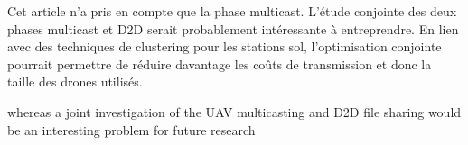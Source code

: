 \documentclass[utf8, a4paper]{beamer}
\begin{document}
\begin{frame} {}

Cet article n'a pris en compte que la phase multicast. L'étude conjointe
des deux phases multicast et D2D serait probablement intéressante à entreprendre.
En lien avec des techniques de clustering pour les stations sol, l'optimisation
conjointe pourrait permettre de réduire davantage les coûts de transmission et donc la taille des drones
utilisés.

\end{frame}

whereas a joint
investigation of the UAV multicasting and D2D file sharing
would be an interesting problem for future research





%
%
\end{document}

